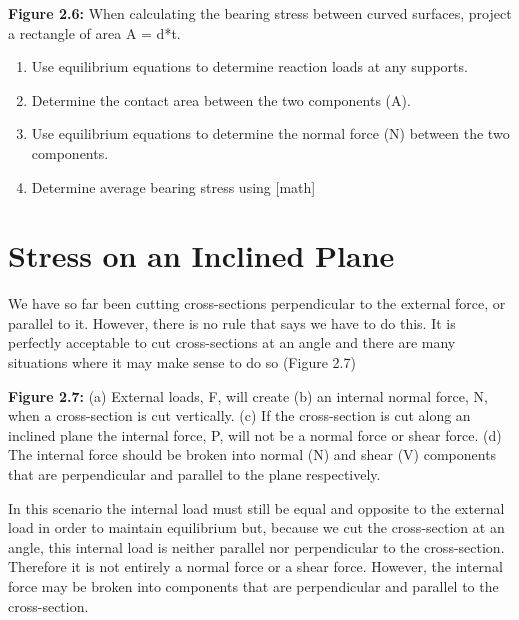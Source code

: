 \documentclass[
  letterpaper,
  DIV=11,
  numbers=noendperiod]{scrreprt}
\begin{document}
\textbf{Figure 2.6:} When calculating the bearing stress between curved
surfaces, project a rectangle of area A = d*t.

\begin{tcolorbox}[enhanced jigsaw, colbacktitle=quarto-callout-note-color!10!white, title={Step-by-step:}, coltitle=black, leftrule=.75mm, rightrule=.15mm, opacityback=0, breakable, colframe=quarto-callout-note-color-frame, left=2mm, arc=.35mm, colback=white, bottomrule=.15mm, bottomtitle=1mm, toptitle=1mm, titlerule=0mm, opacitybacktitle=0.6, toprule=.15mm]

\begin{enumerate}
\def\labelenumi{\arabic{enumi}.}
\item
  Use equilibrium equations to determine reaction loads at any supports.
\item
  Determine the contact area between the two components (A).
\item
  Use equilibrium equations to determine the normal force (N) between
  the two components.
\item
  Determine average bearing stress using {[}math{]}
\end{enumerate}

\end{tcolorbox}

\section{Stress on an Inclined Plane}\label{stress-on-an-inclined-plane}

We have so far been cutting cross-sections perpendicular to the external
force, or parallel to it. However, there is no rule that says we have to
do this. It is perfectly acceptable to cut cross-sections at an angle
and there are many situations where it may make sense to do so (Figure
2.7)

\textbf{Figure 2.7:} (a) External loads, F, will create (b) an internal
normal force, N, when a cross-section is cut vertically. (c) If the
cross-section is cut along an inclined plane the internal force, P, will
not be a normal force or shear force. (d) The internal force should be
broken into normal (N) and shear (V) components that are perpendicular
and parallel to the plane respectively.

In this scenario the internal load must still be equal and opposite to
the external load in order to maintain equilibrium but, because we cut
the cross-section at an angle, this internal load is neither parallel
nor perpendicular to the cross-section. Therefore it is not entirely a
normal force or a shear force. However, the internal force may be broken
into components that are perpendicular and parallel to the
cross-section.
\end{document}

